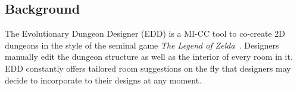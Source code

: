 \subsection{Background}





The Evolutionary Dungeon Designer (EDD) is a MI-CC tool %
to %
co-create 
2D dungeons in the style of the seminal game \emph{The Legend of Zelda}~\cite{p9tloz}.
Designers manually edit the dungeon structure as well as the interior of every room in it. EDD constantly offers tailored room suggestions on the fly that designers may decide to incorporate to their designs at any moment. 

